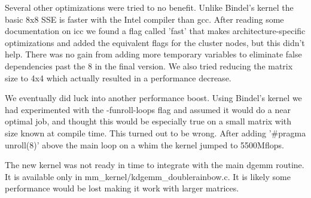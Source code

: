 \documentclass{article}
\begin{document}
Several other optimizations were tried to no benefit. 
Unlike Bindel's kernel the basic 8x8 SSE is faster with the Intel compiler than gcc. 
After reading some documentation on icc we found a flag called 'fast' that makes architecture-specific optimizations 
and added the equivalent flags for the cluster nodes, but this didn't help. There was no gain from adding more temporary variables
to eliminate false dependencies past the 8 in the final version. We also tried reducing the matrix size to 4x4 which actually resulted in a performance decrease.

We eventually did luck into another performance boost. Using Bindel's kernel we had experimented with the -funroll-loops
flag and assumed it would do a near optimal job, and thought this would be especially true on a small matrix with size known at compile time.
This turned out to be wrong. After adding '\#pragma unroll(8)' above the main loop on a whim the kernel jumped to 5500Mflops.

The new kernel was not ready in time to integrate with the main dgemm routine. It is available only in mm\_kernel/kdgemm\_doublerainbow.c. 
It is likely some performance would be lost making it work with larger matrices.
\end{document}
